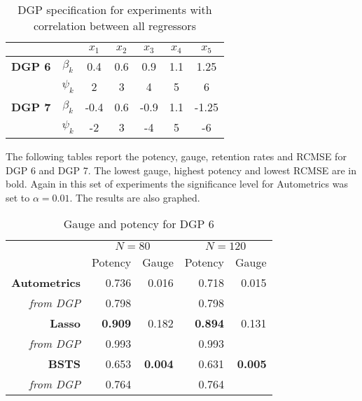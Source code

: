 \begin{table}[h]



\centering
\begin{tabular}{c|c|c|c|c|c|c}

&  &$x_{1}$ &$x_{2}$ &$x_{3}$ &  $x_{4}$ & $x_{5}$  \\
\hline
\textbf{DGP 6} & $\beta_{k}$  & 0.4&0.6 &0.9&1.1  &1.25  \\

 	& $\psi_{k}$  &2 &3 &4 &5 &6 \\
\hline
\textbf{DGP 7} & $\beta_{k}$  & -0.4&0.6 &-0.9&1.1  &-1.25 \\

 	& $\psi_{k}$ &-2 &3 &-4 &5 &-6 \\

    
\end{tabular}
\caption{DGP specification for experiments with correlation between all regressors}
\label{DGP67}
\end{table} 
The following tables report the potency, gauge, retention rates and RCMSE for DGP 6 and DGP 7. The lowest gauge, highest potency and lowest RCMSE are in bold. Again in this set of experiments the significance level for Autometrics was set to $\alpha= 0.01$. The results are also graphed. 
\\
\begin{table}[htbp]
  \centering

    \begin{tabular}{r|r|r|r|r}

         & \multicolumn{2}{|c|}{$N=80$} & \multicolumn{2}{|c}{$N=120$}  \\
            & Potency           & Gauge           & Potency            & Gauge           \\
          \hline
    \textbf{Autometrics} & 0.736 & 0.016 & 0.718 & 0.015 \\
    \textit{from DGP} & 0.798 &       & 0.798 &  \\
    \hline
    \textbf{Lasso} & \textbf{0.909} & 0.182 & \textbf{0.894} & 0.131 \\
    \textit{from DGP} & 0.993 &       & 0.993 &  \\
    \hline
    \textbf{BSTS} & 0.653 & \textbf{0.004} & 0.631 & \textbf{0.005} \\
    \textit{from DGP} & 0.764 &       & 0.764 &  \\

    \end{tabular}%
      \caption{Gauge and potency for DGP 6}
  \label{DGP6GP}%
\end{table}%




